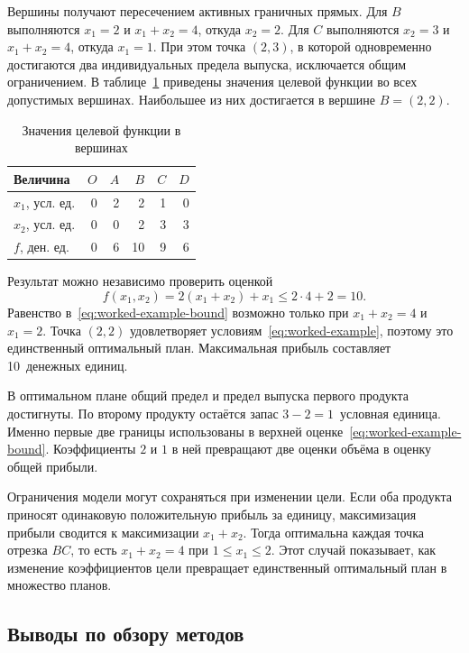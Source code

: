 Вершины получают пересечением активных граничных прямых.
Для $B$ выполняются $x_1=2$ и $x_1+x_2=4$, откуда $x_2=2$.
Для $C$ выполняются $x_2=3$ и $x_1+x_2=4$, откуда $x_1=1$.
При этом точка $(2,3)$, в которой одновременно достигаются два
индивидуальных предела выпуска, исключается общим ограничением.
В таблице~\ref{tab:worked-example-vertices} приведены значения
целевой функции во всех допустимых вершинах. Наибольшее из них
достигается в вершине $B=(2,2)$.

\begin{table}[htbp]
  \caption{Значения целевой функции в вершинах}
  \label{tab:worked-example-vertices}
  \centering
  \begin{tabular}{lrrrrr}
    \toprule
    Величина & $O$ & $A$ & $B$ & $C$ & $D$ \\
    \midrule
    $x_1$, усл. ед. & 0 & 2 & 2 & 1 & 0 \\
    $x_2$, усл. ед. & 0 & 0 & 2 & 3 & 3 \\
    $f$, ден. ед.   & 0 & 6 & 10 & 9 & 6 \\
    \bottomrule
  \end{tabular}
\end{table}

Результат можно независимо проверить оценкой
\begin{equation}
  f(x_1,x_2)=2(x_1+x_2)+x_1 \le 2\cdot 4+2=10.
  \label{eq:worked-example-bound}
\end{equation}
Равенство в~\eqref{eq:worked-example-bound} возможно только при
$x_1+x_2=4$ и $x_1=2$. Точка $(2,2)$ удовлетворяет
условиям~\eqref{eq:worked-example}, поэтому это единственный
оптимальный план. Максимальная прибыль составляет 10~денежных единиц.

В оптимальном плане общий предел и предел выпуска первого продукта
достигнуты. По второму продукту остаётся запас $3-2=1$~условная единица.
Именно первые две границы использованы в верхней
оценке~\eqref{eq:worked-example-bound}. Коэффициенты $2$ и $1$ в ней
превращают две оценки объёма в оценку общей прибыли.

Ограничения модели могут сохраняться при изменении цели. Если оба
продукта приносят одинаковую положительную прибыль за единицу,
максимизация прибыли сводится к максимизации $x_1+x_2$. Тогда
оптимальна каждая точка отрезка $BC$, то есть $x_1+x_2=4$ при
$1\le x_1\le 2$. Этот случай показывает, как изменение коэффициентов
цели превращает единственный оптимальный план в множество планов.

\subsection{Выводы по обзору методов}

